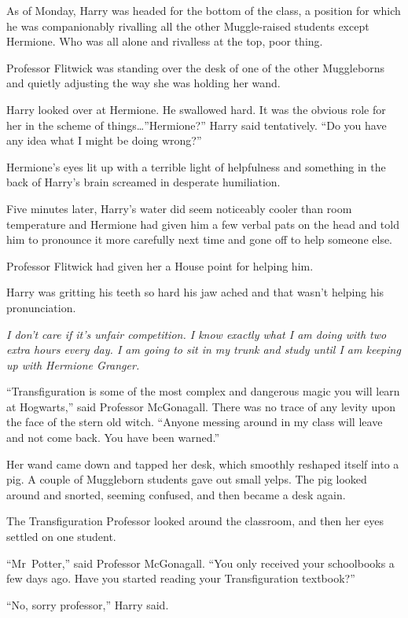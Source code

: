 As of Monday, Harry was headed for the bottom of the class, a position for which he was companionably rivalling all the other Muggle-raised students except Hermione. Who was all alone and rivalless at the top, poor thing.

Professor Flitwick was standing over the desk of one of the other Muggleborns and quietly adjusting the way she was holding her wand.

Harry looked over at Hermione. He swallowed hard. It was the obvious role for her in the scheme of things…”Hermione?” Harry said tentatively. “Do you have any idea what I might be doing wrong?”

Hermione’s eyes lit up with a terrible light of helpfulness and something in the back of Harry’s brain screamed in desperate humiliation.

Five minutes later, Harry’s water did seem noticeably cooler than room temperature and Hermione had given him a few verbal pats on the head and told him to pronounce it more carefully next time and gone off to help someone else.

Professor Flitwick had given her a House point for helping him.

Harry was gritting his teeth so hard his jaw ached and that wasn’t helping his pronunciation.

\emph{I don’t care if it’s unfair competition. I know exactly what I am doing with two extra hours every day. I am going to sit in my trunk and study until I am keeping up with Hermione Granger.}

\later

“Transfiguration is some of the most complex and dangerous magic you will learn at Hogwarts,” said Professor McGonagall. There was no trace of any levity upon the face of the stern old witch. “Anyone messing around in my class will leave and not come back. You have been warned.”

Her wand came down and tapped her desk, which smoothly reshaped itself into a pig. A couple of Muggleborn students gave out small yelps. The pig looked around and snorted, seeming confused, and then became a desk again.

The Transfiguration Professor looked around the classroom, and then her eyes settled on one student.

“Mr~Potter,” said Professor McGonagall. “You only received your schoolbooks a few days ago. Have you started reading your Transfiguration textbook?”

“No, sorry professor,” Harry said.

